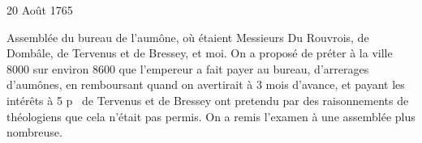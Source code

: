                      \begin{diary}{20 Août 1765}{}
                        
                         Assemblée du bureau de l'aumône, où
                           étaient Messieurs
                           Du Rouvrois, de Dombâle, de
                              Tervenus et de
                              Bressey, et moi. On a
                           proposé
                           de préter à la ville 8000 sur environ 8600 que l'empereur a fait payer au bureau, d'arrerages
                           d'aumônes, en remboursant quand on avertirait
                           à 3 mois d'avance, et payant les intérêts à
                           5 p %
                           de Tervenus et de
                              Bressey ont pretendu par des raisonnements de
                           théologiens que cela n'était pas permis. On a
                           remis l'examen à une assemblée plus nombreuse. \bigskip
        
        
                     \end{diary}

